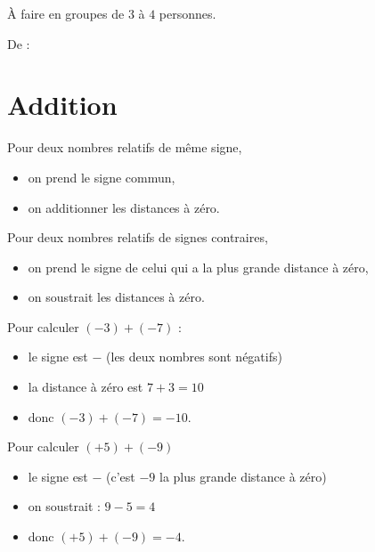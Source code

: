 
À faire en groupes de \( 3\) à \( 4\) personnes.

De : \cite{VJNYooBKjymp}


\section{Addition}

\begin{definition}
    Pour  deux nombres relatifs de même signe,
    \begin{itemize}
        \item on prend le signe commun,
        \item on additionner les distances à zéro.
    \end{itemize}
    Pour  deux nombres relatifs de signes contraires,
    \begin{itemize}
        \item on prend le signe de celui qui a la plus grande distance à zéro,
        \item on soustrait les distances à zéro.
    \end{itemize}
\end{definition}

\begin{example}
    Pour calculer \( (-3)+(-7)\) :
    \begin{itemize}
        \item le signe est \( -\) (les deux nombres sont négatifs)
        \item la distance à zéro est \( 7+3=10\)
        \item donc \( (-3)+(-7)=-10\).
    \end{itemize}
    Pour calculer \( (+5)+(-9)\)
    \begin{itemize}
        \item le signe est \( -\) (c'est \( -9\) la plus grande distance à zéro)
        \item on soustrait : \( 9-5=4\)
        \item donc \( (+5)+(-9)=-4\).
    \end{itemize}
\end{example}

